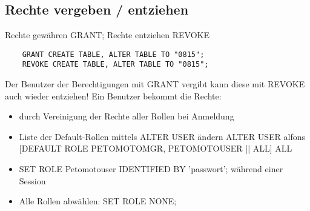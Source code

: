 \documentclass[12pt]{scrreprt}
\begin{document}
\subsection{Rechte vergeben / entziehen}
Rechte gewähren GRANT; Rechte entziehen REVOKE
\begin{lstlisting}
	GRANT CREATE TABLE, ALTER TABLE TO "0815";
	REVOKE CREATE TABLE, ALTER TABLE TO "0815";
\end{lstlisting}
Der Benutzer der Berechtigungen mit GRANT vergibt kann diese mit REVOKE auch wieder entziehen!\newline
Ein Benutzer bekommt die Rechte:
\begin{itemize}
\item durch Vereinigung der Rechte aller Rollen bei Anmeldung
\item Liste der Default-Rollen mittels ALTER USER ändern\newline
		ALTER USER alfons [DEFAULT ROLE PETOMOTOMGR, PETOMOTOUSER || ALL]\newline
		ALL 
\item SET ROLE Petomotouser IDENTIFIED BY 'passwort'; während einer Session
\item Alle Rollen abwählen: SET ROLE NONE;
\end{itemize}
\end{document}
